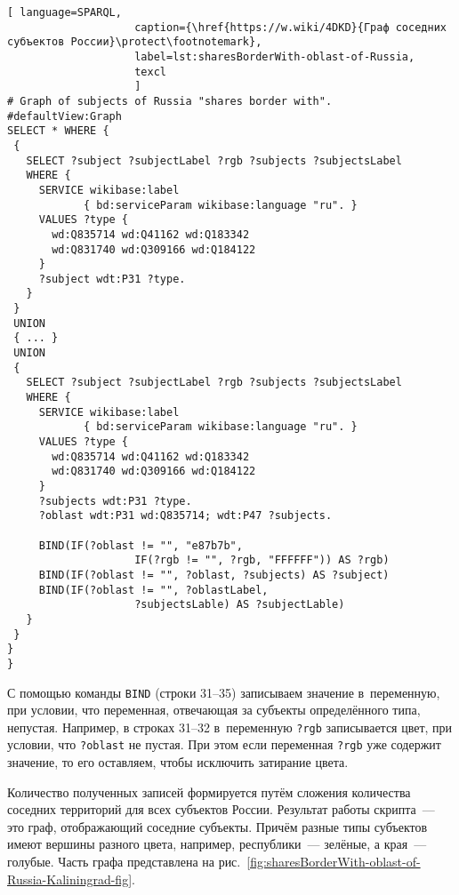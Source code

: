 \lstset{numbers=left, firstnumber=1, frame=single}
\begin{lstlisting}[ language=SPARQL, 
                    caption={\href{https://w.wiki/4DKD}{Граф соседних субъектов России}\protect\footnotemark},
                    label=lst:sharesBorderWith-oblast-of-Russia,
                    texcl 
                    ]
# Graph of subjects of Russia "shares border with". 
#defaultView:Graph
SELECT * WHERE {
 {
   SELECT ?subject ?subjectLabel ?rgb ?subjects ?subjectsLabel 
   WHERE {
     SERVICE wikibase:label 
            { bd:serviceParam wikibase:language "ru". }
     VALUES ?type {
       wd:Q835714 wd:Q41162 wd:Q183342
       wd:Q831740 wd:Q309166 wd:Q184122
     }
     ?subject wdt:P31 ?type.
   }
 }
 UNION
 { ... }
 UNION
 {
   SELECT ?subject ?subjectLabel ?rgb ?subjects ?subjectsLabel 
   WHERE {
     SERVICE wikibase:label 
            { bd:serviceParam wikibase:language "ru". }
     VALUES ?type {
       wd:Q835714 wd:Q41162 wd:Q183342
       wd:Q831740 wd:Q309166 wd:Q184122
     }
     ?subjects wdt:P31 ?type.
     ?oblast wdt:P31 wd:Q835714; wdt:P47 ?subjects.
     
     BIND(IF(?oblast != "", "e87b7b", 
                    IF(?rgb != "", ?rgb, "FFFFFF")) AS ?rgb)
     BIND(IF(?oblast != "", ?oblast, ?subjects) AS ?subject)
     BIND(IF(?oblast != "", ?oblastLabel, 
                    ?subjectsLable) AS ?subjectLable)
   }
 }
}
}
\end{lstlisting}%

С помощью команды \lstinline|BIND| (строки 31--35) 
записываем значение в~переменную, при условии, что переменная, 
отвечающая за субъекты определённого типа, непустая. 
Например, в строках 31--32 в~переменную \lstinline|?rgb| записывается цвет, 
при условии, что \lstinline|?oblast| не пустая. 
При этом если переменная \lstinline|?rgb| уже содержит значение, 
то его оставляем, чтобы исключить затирание цвета.

Количество полученных записей формируется путём сложения количества соседних территорий для всех субъектов России. Результат работы скрипта~--- это граф, отображающий соседние субъекты. Причём разные типы субъектов имеют вершины разного цвета, например, республики~--- зелёные, а края~--- голубые. Часть графа представлена на рис.~\ref{fig:sharesBorderWith-oblast-of-Russia-Kaliningrad-fig}.

